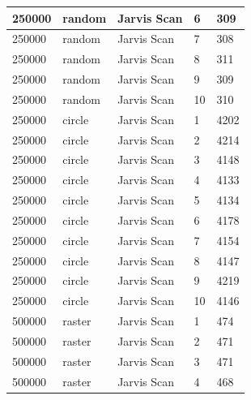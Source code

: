 \documentclass[12pt]{article}
\begin{document}
\begin{longtable}{|l|l|l|l|l|}
250000       & random            & Jarvis Scan & 6          & 309                           \\ \hline
250000       & random            & Jarvis Scan & 7          & 308                           \\ \hline
250000       & random            & Jarvis Scan & 8          & 311                           \\ \hline
250000       & random            & Jarvis Scan & 9          & 309                           \\ \hline
250000       & random            & Jarvis Scan & 10         & 310                           \\ \hline
250000       & circle            & Jarvis Scan & 1          & 4202                          \\ \hline
250000       & circle            & Jarvis Scan & 2          & 4214                          \\ \hline
250000       & circle            & Jarvis Scan & 3          & 4148                          \\ \hline
250000       & circle            & Jarvis Scan & 4          & 4133                          \\ \hline
250000       & circle            & Jarvis Scan & 5          & 4134                          \\ \hline
250000       & circle            & Jarvis Scan & 6          & 4178                          \\ \hline
250000       & circle            & Jarvis Scan & 7          & 4154                          \\ \hline
250000       & circle            & Jarvis Scan & 8          & 4147                          \\ \hline
250000       & circle            & Jarvis Scan & 9          & 4219                          \\ \hline
250000       & circle            & Jarvis Scan & 10         & 4146                          \\ \hline
500000       & raster            & Jarvis Scan & 1          & 474                           \\ \hline
500000       & raster            & Jarvis Scan & 2          & 471                           \\ \hline
500000       & raster            & Jarvis Scan & 3          & 471                           \\ \hline
500000       & raster            & Jarvis Scan & 4          & 468                           \\ \hline

\end{longtable}
\end{document}
